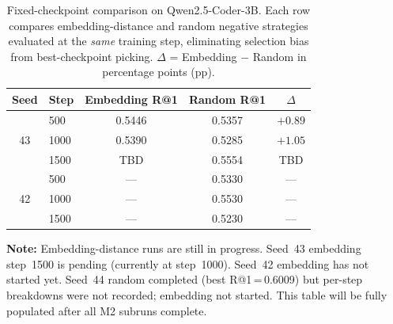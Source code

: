 %

\begin{table}[t]
\centering
\caption{Fixed-checkpoint comparison on Qwen2.5-Coder-3B. Each row compares
  embedding-distance and random negative strategies evaluated at the \emph{same}
  training step, eliminating selection bias from best-checkpoint picking.
  $\Delta$ = Embedding $-$ Random in percentage points (pp).}
\label{tab:fixed-checkpoint}
\begin{tabular}{cl ccc}
\toprule
Seed & Step & Embedding R@1 & Random R@1 & $\Delta$ \\
\midrule
\multirow{3}{*}{43}
  & 500  & 0.5446 & 0.5357 & $+0.89$ \\
  & 1000 & 0.5390 & 0.5285 & $+1.05$ \\
  & 1500 & TBD    & 0.5554 & TBD     \\
\midrule
\multirow{3}{*}{42}
  & 500  & ---    & 0.5330 & ---     \\
  & 1000 & ---    & 0.5530 & ---     \\
  & 1500 & ---    & 0.5230 & ---     \\
\bottomrule
\end{tabular}

\vspace{2pt}
{\footnotesize
\textbf{Note:} Embedding-distance runs are still in progress.
Seed~43 embedding step~1500 is pending (currently at step~1000).
Seed~42 embedding has not started yet.
Seed~44 random completed (best R@1\,=\,0.6009) but per-step breakdowns
were not recorded; embedding not started.
This table will be fully populated after all M2 subruns complete.
}
\end{table}
